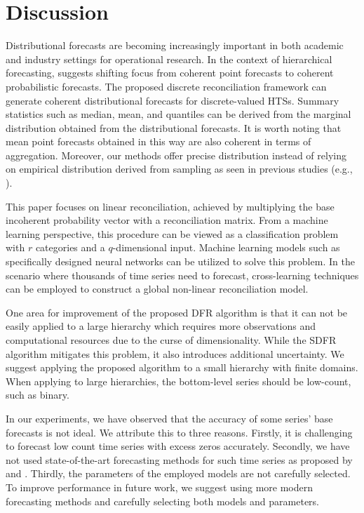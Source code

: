 \documentclass[a4paper,review,12pt,authoryear]{elsarticle}
\begin{document}
     \section{Discussion}

    

     Distributional forecasts are becoming increasingly important in both academic and industry settings for operational research. In the context of hierarchical forecasting, \cite{kolassaWeWantCoherent2022} suggests shifting focus from coherent point forecasts to coherent probabilistic forecasts. 
     The proposed discrete reconciliation framework can generate coherent distributional forecasts for discrete-valued HTSs.  
     Summary statistics such as median, mean, and quantiles can be derived from the marginal distribution obtained from the distributional forecasts. 
     It is worth noting that mean point forecasts obtained in this way are also coherent in terms of aggregation.
     Moreover, our methods offer precise distribution instead of relying on empirical distribution derived from sampling as seen in previous studies (e.g., \citealp{jeonProbabilisticForecastReconciliation2019,coraniProbabilisticReconciliationCount2022}).

     This paper focuses on linear reconciliation, achieved by multiplying the base incoherent probability vector with a reconciliation matrix. 
     From a machine learning perspective, this procedure can be viewed as a classification problem with $r$ categories and a $q$-dimensional input. Machine learning models such as specifically designed neural networks can be utilized to solve this problem. 
     In the scenario where thousands of time series need to forecast, cross-learning techniques can be employed to construct a global non-linear reconciliation model. 

     One area for improvement of the proposed DFR algorithm is that it can not be easily applied to a large hierarchy which requires more observations and computational resources due to the curse of dimensionality.
     While the SDFR algorithm mitigates this problem, it also introduces additional uncertainty. 
     We suggest applying the proposed algorithm to a small hierarchy with finite domains. 
     When applying to large hierarchies, the bottom-level series should be low-count, such as binary.

     In our experiments, we have observed that the accuracy of some series' base forecasts is not ideal. 
     We attribute this to three reasons. Firstly, it is challenging to forecast low count time series with excess zeros accurately. 
     Secondly, we have not used state-of-the-art forecasting methods for such time series as proposed by \cite{berryBayesianForecastingMany2020a} and \cite{weiEmpiricalLikelihoodRatio2021}. 
     Thirdly, the parameters of the employed models are not carefully selected. 
     To improve performance in future work, we suggest using more modern forecasting methods and carefully selecting both models and parameters.
\end{document}
